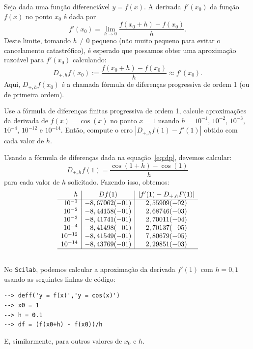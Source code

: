 Seja dada uma função diferenciável $y = f(x)$. A derivada $f'(x_0)$ da função $f(x)$ no ponto $x_0$ é dada por
\begin{equation*}
  f'(x_0)=\lim_{h\to 0}\frac{f(x_0+h)-f(x_0)}{h}.
\end{equation*}
Deste limite, tomando $h\neq 0$ pequeno (não muito pequeno para evitar o cancelamento catastrófico), é esperado que possamos obter uma aproximação razoável para $f'(x_0)$ calculando:
\begin{equation}\label{eq:dp}
  D_{+,h}f(x_0) := \frac{f(x_0+h)-f(x_0)}{h} \approx f'(x_0).
\end{equation}
Aqui, $D_{+,h}f(x_0)$ é a chamada fórmula de diferenças progressiva de ordem 1 (ou de primeira ordem).

\begin{ex}\label{ex:dp}
Use a fórmula de diferenças finitas progressiva de ordem 1, calcule aproximações da derivada de $f(x)=\cos(x)$ no ponto $x=1$ usando $h=10^{-1}$, $10^{-2}$, $10^{-3}$, $10^{-4}$, $10^{-12}$ e $10^{-14}$. Então, compute o erro $|D_{+,h}f(1)-f'(1)|$ obtido com cada valor de $h$.
\end{ex}
\begin{sol}
Usando a fórmula de diferenças dada na equação~\eqref{eq:dp}, devemos calcular:
\begin{equation*}
  D_{+,h}f(1) = \frac{\cos(1 + h) - \cos(1)}{h}
\end{equation*}
para cada valor de $h$ solicitado. Fazendo isso, obtemos:
\begin{equation*}
  \begin{array}{r|c|c}
    h & Df(1) & |f'(1) - D_{+,h}F(1)| \\ \hline
    10^{-1} & -8,67062(-01) & 2,55909(-02)\\
    10^{-2} & -8,44158(-01) & 2,68746(-03)\\
    10^{-3} & -8,41741(-01) & 2,70011(-04)\\
    10^{-4} & -8,41498(-01) & 2,70137(-05) \\
    10^{-12} & -8,41549(-01) & 7,80679(-05)\\
    10^{-14} & -8,43769(-01) & 2,29851(-03) \\\hline
    \multicolumn{3}{c}{}
  \end{array}
\end{equation*}

\ifisscilab
No \verb+Scilab+, podemos calcular a aproximação da derivada $f'(1)$ com $h=0,1$ usando as seguintes linhas de código:
\begin{verbatim}
--> deff('y = f(x)','y = cos(x)')
--> x0 = 1
--> h = 0.1
--> df = (f(x0+h) - f(x0))/h
\end{verbatim}
E, similarmente, para outros valores de $x_0$ e $h$.
\fi
\end{sol}

